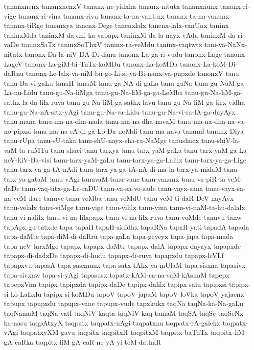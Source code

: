 {tananxnenx
tananxnenxV
tananx-ne-yidxha
tananx-nitutx
tananxnunx
tananx-ri-vige
tananx-ri-vina
tananx-rivu
tananx-ta-na-vanUnx
tananx-ta-na-vanunx
tananx-tiRge
tananxya
tanenx-Dege
tanenxlalx
tanenx-lalx-vanUnx
taninx
taninxMda
taninxM-da-dhi-ka-vapapx
taninxM-da-la-nayx-vAda
taninxM-da-ri-vaDe
taninxSaTx
taninxSoThxV
taninx-ra-veMdu
taninx-vaqtwtx
tani-va-NaNx-nitutx
tanonx-Da-la-niV-DA-Di-danu
tanonx-La-ga-ri-vudu
tanonx-Lage
tanonx-LageV
tanonx-La-giM-bi-TuTx-koMDu
tanonx-La-koMDa
tanonx-La-koM-Di-daRnu
tanonx-Le-lalx-va-niM-bu-go-Li-si-ya-Bi-nanx-va-pupxde
tanonxV
tanu
tanu-Ba-vi-gaLu
tanuH
tanuM
tanu-ga-NA-di-gaLa
tanu-guNa
tanu-gu-NaM-ga-La-nu-Lidu
tanu-gu-Na-liMga
tanu-gu-Na-liM-ga-ga-LeMba
tanu-gu-Na-liM-ga-sathx-la-da-lilx-ruva
tanu-gu-Na-liM-ga-sathx-lavu
tanu-gu-Na-liM-ga-tirx-vidha
tanu-gu-Na-nA-sitx-yAgi
tanu-gu-Na-va-Lidu
tanu-gu-Na-vi-ra-lA-ga-dayAyx
tanu-mana
tanu-ma-na-dha-nada
tanu-ma-na-dha-navaM
tanu-ma-na-dha-na-va-no-pipxsi
tanu-ma-na-sA-di-ga-Lo-Da-noMdi
tanu-ma-nava
tanumf
tanunx-Diya
tanu-rUpa
tanu-sU-taka
tanu-shU-nayx-sha-ra-NaMge
tanushacx
tanu-shiV-la-vaM-ta-ruMTu
tanu-shuci
tanu-tarxya
tanu-tarx-yaM-gaLa
tanu-tarx-yaM-ga-La-neV-kiV-Ba-visi
tanu-tarx-yaM-gaLu
tanu-tarx-ya-ga-Lalilx
tanu-tarx-ya-ga-Lige
tanu-tarx-ya-ga-tA-nAdi
tanu-tarx-ya-ga-tA-nA-di-ma-la-tarx-ya-midaM
tanu-tarx-ya-gataM
tanu-vAgi
tanuvaM
tanu-vane
tanu-vanunx
tanu-va-piR-ta-veM-daDe
tanu-vaq-titx-ga-Le-raDU
tanu-va-sa-ve-sade
tanu-vayx-sana
tanu-vayx-sa-na-veM-dare
tanuve
tanu-veMba
tanu-veMdU
tanu-veM-ti-daR-DeV-nayAyx
tanu-velalx
tanu-viMge
tanu-vige
tanu-vililx
tanu-vina
tanu-vi-naM-ta-hu-dalalx
tanu-vi-nalilx
tanu-vi-na-lilxpapx
tanu-vi-na-lilx-ruva
tanu-voMde
tanuvu
tanw
tapApx-gu-tatxde
tapa
tapaH
tapaH-sididhx
tapaRNa
tapaR-yati
tapadA
tapada
tapa-daMte
tapa-diM-di-daRru
tapa-gaLa
tapa-geyeyx
tapa-japa
tapa-mada
tapa-neV-tarxMge
tapapx
tapapx-daMte
tapapx-dalA
tapapx-dayayx
tapapxde
tapapx-di-dadxDe
tapapx-di-hudu
tapapx-di-ruva
tapapxdu
tapapx-leVLf
tapapxvu
tapasA
tapa-sasxnunx
tapa-satx-tAkx-ya-mUlaM
tapa-sisxna
tapasivx
tapa-sivxnw
tapa-si-yAgi
tapasusx
tapatx-kAM-ca-na-saM-kAshaM
tapepx
tapepxVnu
tapipx
tapipxda
tapipx-daDe
tapipx-dalilx
tapipx-salu
tapipxsi
tapipx-si-ko-LaLxlu
tapipx-si-koMDu
tapoV
tapoV-japaM
tapoV-loVka
tapoV-yajacnx
tapupx
tapupxdu
tapupx-vane
tapupx-vude
tapxkukx
taqNa
taqNa-ka-Na-gaLu
taqNamaM
taqNa-vatf
taqNiV-kaqta
taqNiV-kaq-tamaM
taqSA
taqSe
taqSeNx-ka-nasu
taqpAtxyX
taqpatx
taqpatx-nAgi
taqpatxnu
taqpatx-rA-galekx
taqpatx-vAgi
taqpatxyXM-gavu
taqpitx
taqpitxH
taqpitxM
taqpitx-baTuTx
taqpitx-liM-gA-caRka
taqpitx-liM-gA-caR-ne-yA-yi-teM-dathaR
}
